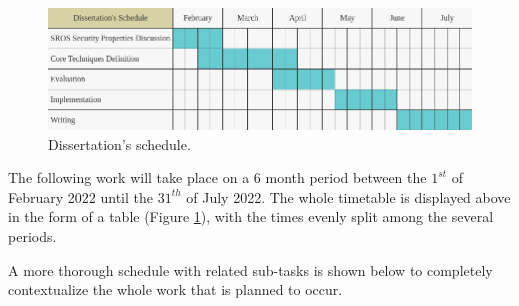 \begin{figure}[H]
    \centering
    \includegraphics[width=\linewidth]{img/dissertation-schedule.png}
    \caption{Dissertation's schedule.}
    \label{fig:dissertation-schedule}
\end{figure}

The following work will take place on a $6$ month period between the $1^{st}$ of February 2022 until the $31^{th}$ of July 2022. The whole timetable is displayed above in the form of a table (Figure \ref{fig:dissertation-schedule}), with the times evenly split among the several periods. 

A more thorough schedule with related sub-tasks is shown below to completely contextualize the whole work that is planned to occur.


